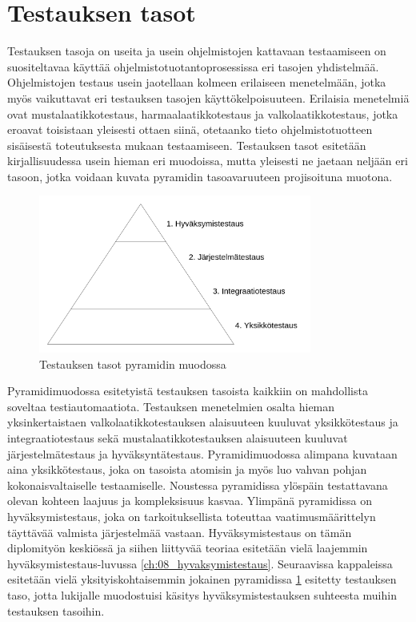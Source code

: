 \section{Testauksen tasot} \label{ch:07_testauksen_tasot}

  Testauksen tasoja on useita ja usein ohjelmistojen kattavaan testaamiseen on suositeltavaa käyttää ohjelmistotuotantoprosessissa eri tasojen yhdistelmää.
  Ohjelmistojen testaus usein jaotellaan kolmeen erilaiseen menetelmään, jotka myös vaikuttavat eri testauksen tasojen käyttökelpoisuuteen.
  Erilaisia menetelmiä ovat mustalaatikkotestaus, harmaalaatikkotestaus ja valkolaatikkotestaus, jotka eroavat toisistaan yleisesti ottaen siinä, otetaanko tieto ohjelmistotuotteen sisäisestä toteutuksesta mukaan testaamiseen.
  Testauksen tasot esitetään kirjallisuudessa usein hieman eri muodoissa, mutta yleisesti ne jaetaan neljään eri tasoon, jotka voidaan kuvata pyramidin tasoavaruuteen projisoituna muotona.

  \begin{figure}[H]
    \centering
    \includegraphics[width=0.8\textwidth]{assets/testing-levels-pyramid.png}
    \caption{Testauksen tasot pyramidin muodossa}
    \label{fig:testing-levels-pyramid}
  \end{figure}

  Pyramidimuodossa esitetyistä testauksen tasoista kaikkiin on mahdollista soveltaa testiautomaatiota.
  Testauksen menetelmien osalta hieman yksinkertaistaen valkolaatikkotestauksen alaisuuteen kuuluvat yksikkötestaus ja integraatiotestaus sekä mustalaatikkotestauksen alaisuuteen kuuluvat järjestelmätestaus ja hyväksyntätestaus.
  Pyramidimuodossa alimpana kuvataan aina yksikkötestaus, joka on tasoista atomisin ja myös luo vahvan pohjan kokonaisvaltaiselle testaamiselle.
  Noustessa pyramidissa ylöspäin testattavana olevan kohteen laajuus ja kompleksisuus kasvaa.
  Ylimpänä pyramidissa on hyväksymistestaus, joka on tarkoituksellista toteuttaa vaatimusmäärittelyn täyttävää valmista järjestelmää vastaan.
  Hyväksymistestaus on tämän diplomityön keskiössä ja siihen liittyvää teoriaa esitetään vielä laajemmin hyväksymistestaus-luvussa \ref{ch:08_hyvaksymistestaus}.
  Seuraavissa kappaleissa esitetään vielä yksityiskohtaisemmin jokainen pyramidissa \ref{fig:testing-levels-pyramid} esitetty testauksen taso, jotta lukijalle muodostuisi käsitys hyväksymistestauksen suhteesta muihin testauksen tasoihin.

